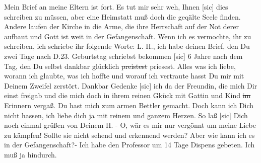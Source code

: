 \def\day{21. Mai 1944}
\mktitle

Mein Brief an meine Eltern ist fort.
Es tut mir sehr weh, Ihnen{\color{red} [sic] } dies schreiben zu m\"{u}ssen, aber eine Heimstatt mu{\ss} doch die geq\"{a}lte Seele finden.
Andere laufen der Kirche in die Arme, die ihre Herrschaft auf der Not derer aufbaut und Gott ist weit in der Gefangenschaft.
Wenn ich es vermochte, ihr zu schreiben, ich schriebe ihr folgende Worte: L. H., ich habe deinen Brief, den Du zwei Tage nach D.23. Geburtstag schriebst bekommen{\color{red} [sic] }
6 Jahre nach dem Tag, den Du selbst dankbar gl\"{u}cklich \st{preistest} priesest.
Alles was ich liebe, worann ich glaubte, was ich hoffte und worauf ich vertraute hasst Du mir mit Deinem Zweifel zerst\"{o}rt.
Dankbar Gedenke{\color{red} [sic] } ich da der Freundin, die mich Dir einst freigab und die mich doch in ihrem reinen Gk\"{u}ck mit Gattin und Kind \st{im} Erinnern verga{\ss}.
Du hast mich zum armen Bettler gemacht.
Doch kann ich Dich nicht hassen, ich liebe dich ja mit reinem und ganzem Herzen.
So la{\ss}{\color{red} [sic] } Dich noch einmal gr\"{u}{\ss}en von Deinem H. -
O, w\"{a}r es mir nur verg\"{o}nnt um meine Liebe zu k\"{a}mpfen!
Sollte sie nicht sehend und erkennend werden?
Aber wie kann ich es in der Gefangenschaft?-
Ich habe den Professor um 14 Tage Dispens gebeten.
Ich mu{\ss} ja hindurch.

\clearpage
